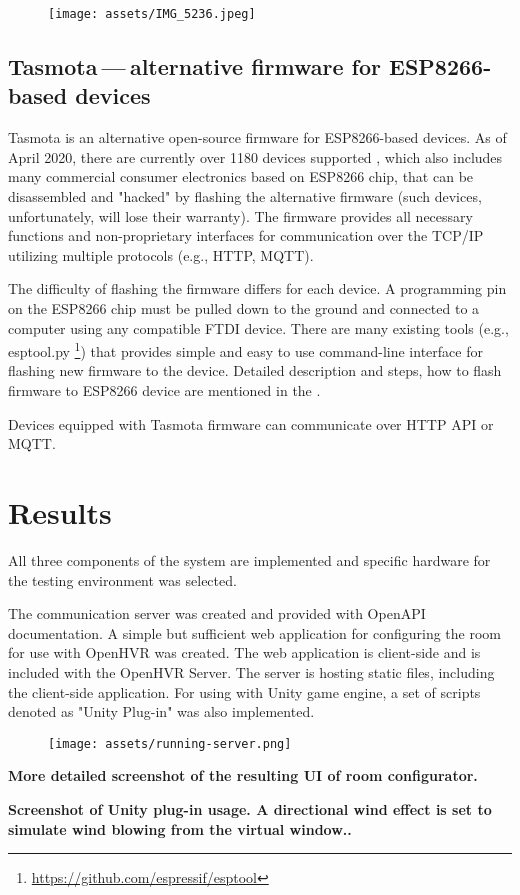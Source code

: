 \begin{figure}[h]{}
\centering\texttt{[image: assets/IMG\_5236.jpeg]}
\caption{}

\end{figure}

\hypertarget{x-tasmota — alternative-firmware-for-esp8266-based-devices}{\subsection{Tasmota — alternative firmware for ESP8266-based devices}}
Tasmota is an alternative open-source firmware for ESP8266-based devices.
As of April 2020, there are currently over 1180 devices supported \hyperlink{tasdirec}{},
which also includes many commercial consumer electronics based on ESP8266 chip,
that can be disassembled and "hacked" by flashing the alternative firmware
(such devices, unfortunately, will lose their warranty).
The firmware provides all necessary functions and non-proprietary
interfaces for communication over the TCP/IP utilizing multiple protocols
(e.g., HTTP, MQTT).


The difficulty of flashing the firmware differs for each device. A programming pin
on the ESP8266 chip must be pulled down to the ground and connected to a computer using
any compatible FTDI device. There are many existing tools (e.g., esptool.py
\footnote{\href{https://github.com/espressif/esptool}{https://github.com/espressif/esptool}})
that provides simple and easy to use command-line
interface for flashing new firmware to the device. Detailed description and
steps, how to flash firmware to ESP8266 device are mentioned in the
\hyperlink{./12-install-guide}{}.


Devices equipped with Tasmota firmware can communicate over HTTP API or MQTT.


\hypertarget{x-results}{\section{Results}}
All three components of the system are implemented and specific hardware
for the testing environment was selected.


The communication server was created and provided with OpenAPI documentation.
A simple but sufficient web application for configuring the room for use with
OpenHVR was created. The web application is client-side and is included with
the OpenHVR Server. The server is hosting static files,
including the client-side application.
For using with Unity game engine, a set of scripts denoted as "Unity Plug-in"
was also implemented.


\begin{figure}[h]{}
\centering\texttt{[image: assets/running-server.png]}
\caption{}

\end{figure}

\textbf{More detailed screenshot of the resulting UI of room configurator.} 


\textbf{Screenshot of Unity plug-in usage. A directional wind effect is set to simulate wind blowing from the virtual window..} 


